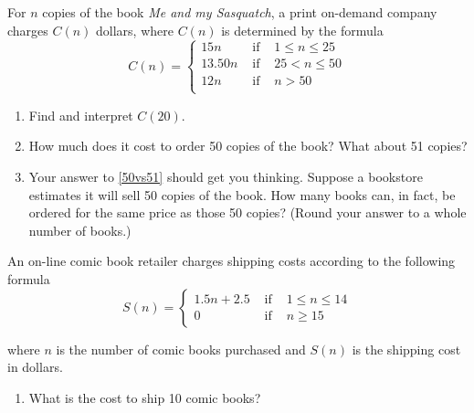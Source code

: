 \begin{exenum}

\item \label{piecewiseordering} For $n$ copies of the book \textit{Me and my Sasquatch}, a print on-demand company charges $C(n)$ dollars, where $C(n)$ is determined by the formula \[{\displaystyle C(n) = \left\{ \begin{array}{rcl}  15n & \mbox{ if } & 1 \leq n \leq 25  \\
                                                            13.50n  & \mbox{ if } & 25 < n \leq 50 \\
                                                            12n & \mbox{ if } & n > 50 \\
                                     \end{array} \right. }\]


\begin{enumerate}

\item  Find and interpret $C(20)$.

\item  \label{50vs51} How much does it cost to order 50 copies of the book?  What about 51 copies?

\item  Your answer to \ref{50vs51} should get you thinking. Suppose a bookstore estimates it will sell 50 copies of the book.  How many books can, in fact, be ordered for the same price as those 50 copies? (Round your answer to a  whole number of books.)

\end{enumerate}

\item \label{piecewiseshipping} An on-line comic book retailer charges shipping costs according to the following formula \[{\displaystyle S(n) = \left\{ \begin{array}{rcl}  1.5 n + 2.5 & \mbox{ if } & 1 \leq n \leq 14  \\
                                                            0  & \mbox{ if } & n \geq 15
                                     \end{array} \right. }\]

where $n$ is the number of  comic books purchased and $S(n)$ is the shipping cost in dollars.

\begin{enumerate}

\item  What is the cost to ship 10 comic books?


\end{enumerate}
\end{exenum}

